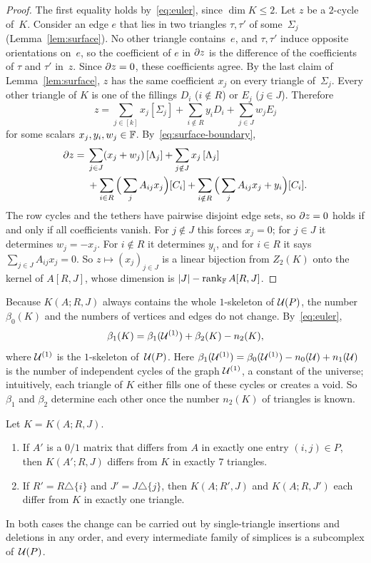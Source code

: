 \begin{proof}
The first equality holds by~\eqref{eq:euler}, since $\dim K\le2$.
Let $z$ be a $2$-cycle of~$K$.
Consider an edge $e$ that lies in two triangles $\tau,\tau'$ of some~$\Sigma_j$ (Lemma~\ref{lem:surface}).
No other triangle contains~$e$, and $\tau,\tau'$ induce opposite orientations on~$e$, so the coefficient of $e$ in $\partial z$ is the difference of the coefficients of $\tau$ and $\tau'$ in~$z$.
Since $\partial z=0$, these coefficients agree.
By the last claim of Lemma~\ref{lem:surface}, $z$ has the same coefficient $x_j$ on every triangle of~$\Sigma_j$.
Every other triangle of $K$ is one of the fillings $D_i$ ($i\notin R$) or $E_j$ ($j\in J$).
Therefore
\[
  z=\sum_{j\in[k]}x_j[\Sigma_j]+\sum_{i\notin R}y_iD_i+\sum_{j\in J}w_jE_j
\]
for some scalars $x_j,y_i,w_j\in\mathbb{F}$.
By~\eqref{eq:surface-boundary},
\begin{align*}
  \partial z={}&\sum_{j\in J}(x_j+w_j)\,[\Lambda_j]+\sum_{j\notin J}x_j\,[\Lambda_j]\\
  &+\sum_{i\in R}\Big(\sum_{j}A_{ij}x_j\Big)[C_i]+\sum_{i\notin R}\Big(\sum_{j}A_{ij}x_j+y_i\Big)[C_i].
\end{align*}
The row cycles and the tethers have pairwise disjoint edge sets, so $\partial z=0$ holds if and only if all coefficients vanish.
For $j\notin J$ this forces $x_j=0$; for $j\in J$ it determines $w_j=-x_j$.
For $i\notin R$ it determines $y_i$, and for $i\in R$ it says $\sum_{j\in J}A_{ij}x_j=0$.
So $z\mapsto(x_j)_{j\in J}$ is a linear bijection from $Z_2(K)$ onto the kernel of $A[R,J]$, whose dimension is $|J|-\operatorname{rank}_{\mathbb{F}}A[R,J]$.
\end{proof}

Because $K(A;R,J)$ always contains the whole $1$-skeleton of $\mathcal{U}(P)$, the number $\beta_0(K)$ and the numbers of vertices and edges do not change.
By~\eqref{eq:euler},
\begin{equation}\label{eq:b1-from-b2}
  \beta_1(K)=\beta_1(\mathcal{U}^{(1)})+\beta_2(K)-n_2(K),
\end{equation}
where $\mathcal{U}^{(1)}$ is the $1$-skeleton of~$\mathcal{U}(P)$.
Here $\beta_1(\mathcal{U}^{(1)})=\beta_0(\mathcal{U}^{(1)})-n_0(\mathcal{U})+n_1(\mathcal{U})$ is the number of independent cycles of the graph $\mathcal{U}^{(1)}$, a constant of the universe; intuitively, each triangle of $K$ either fills one of these cycles or creates a void.
So $\beta_1$ and $\beta_2$ determine each other once the number $n_2(K)$ of triangles is known.

\begin{lemma}[Locality]\label{lem:locality}
Let $K=K(A;R,J)$.
\begin{enumerate}[label=(\roman*)]
\item If $A'$ is a $0/1$ matrix that differs from $A$ in exactly one entry $(i,j)\in P$, then $K(A';R,J)$ differs from $K$ in exactly $7$ triangles.
\item If $R'=R\triangle\{i\}$ and $J'=J\triangle\{j\}$, then $K(A;R',J)$ and $K(A;R,J')$ each differ from $K$ in exactly one triangle.
\end{enumerate}
In both cases the change can be carried out by single-triangle insertions and deletions in any order, and every intermediate family of simplices is a subcomplex of~$\mathcal{U}(P)$.
\end{lemma}

